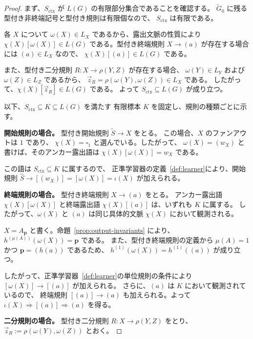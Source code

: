 \documentclass[11pt,a4paper]{ltjsarticle}
\theoremstyle{remark}
\newcommand{\tuple}[1]{\vec{#1}}
\newcommand{\blank}{\square}
\begin{document}
\begin{proof}
まず、\(S_{\mathrm{ctx}}\) が \(L(G)\) の有限部分集合であることを確認する。
\(\widetilde G_0\) に残る型付き非終端記号と型付き規則は有限個なので、
\(S_{\mathrm{ctx}}\) は有限である。

各 \(X\) について \(\omega(X)\in L_X\) であるから、露出文脈の性質により
\(\chi(X)[\omega(X)]\in L(G)\) である。型付き終端規則
\(X\to(a)\) が存在する場合には \((a)\in L_X\) なので、
\(\chi(X)[(a)]\in L(G)\) である。

また、型付き二分規則 \(R\colon X\to\rho(Y,Z)\) が存在する場合、
\(\omega(Y)\in L_Y\) および \(\omega(Z)\in L_Z\) であるから、
\(\tuple z_R=\rho(\omega(Y),\omega(Z))\in L_X\) である。
したがって、\(\chi(X)[\tuple z_R]\in L(G)\) である。
よって \(S_{\mathrm{ctx}}\subseteq L(G)\) が成り立つ。

以下、\(S_{\mathrm{ctx}}\subseteq K\subseteq L(G)\) を満たす
有限標本 \(K\) を固定し、規則の種類ごとに示す。

\medskip
\noindent
\textbf{開始規則の場合。}
型付き開始規則 \(\widetilde S\to X\) をとる。
この場合、\(X\) のファンアウトは \(1\) であり、
\(\chi(X)=\blank_1\) と選んでいる。したがって、
\(\omega(X)=(w_X)\) と書けば、そのアンカー露出語は
\(\chi(X)[\omega(X)]=w_X\) である。

この語は \(S_{\mathrm{ctx}}\subseteq K\) に属するので、
正準学習器の定義~\ref{def:learner}により、開始規則
\(\widehat S\to[(w_X)]=[\omega(X)]=\iota(X)\) が加えられる。

\medskip
\noindent
\textbf{終端規則の場合。}
型付き終端規則 \(X\to(a)\) をとる。
アンカー露出語 \(\chi(X)[\omega(X)]\) と終端露出語
\(\chi(X)[(a)]\) は、いずれも \(K\) に属する。
したがって、\(\omega(X)\) と \((a)\) は同じ具体的文脈
\(\chi(X)\) において観測される。

\(X=A_{\mathbf p}\) と書く。命題~\ref{prop:output-invariants} により、
\(h^{(\mu(A))}(\omega(X))=\mathbf p\) である。
また、型付き終端規則の定義から \(\mu(A)=1\) かつ
\(\mathbf p=(h(a))\) であるため、
\(h^{(1)}(\omega(X))=h^{(1)}((a))\) が成り立つ。


したがって、正準学習器~\ref{def:learner}の単位規則の条件により
\([\omega(X)]\to[(a)]\) が加えられる。
さらに、\((a)\) は \(K\) において観測されているので、
終端規則 \([(a)]\to(a)\) も加えられる。よって
\(\iota(X)\Rightarrow[(a)]\Rightarrow(a)\) を得る。

\medskip
\noindent
\textbf{二分規則の場合。}
型付き二分規則
\(R\colon X\to\rho(Y,Z)\) をとり、
\(\tuple z_R:=\rho(\omega(Y),\omega(Z))\) とおく。


\end{proof}
\end{document}
